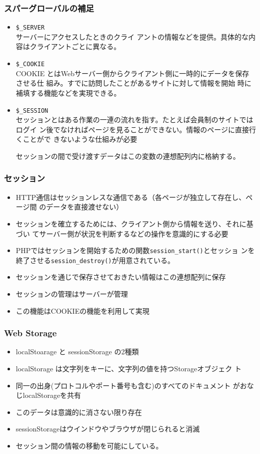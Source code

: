 \begin{frame}[containsverbatim]
\frametitle{スパーグローバルの補足}
\begin{itemize}
 \item {\texttt{\$\_SERVER}}\\
サーバーにアクセスしたときのクライ
アントの情報などを提供。具体的な内容はクライアントごとに異なる。
 \item \texttt{\$\_COOKIE}\\
COOKIE とはWebサーバー側からクライアント側に一時的にデータを保存させる仕
組み。すでに訪問したことがあるサイトに対して情報を開始
時に補填する機能などを実現できる。
 \item \texttt{\$\_SESSION}\\
セッションとはある作業の一連の流れを指す。たとえば会員制のサイトではログイ
ン後でなければページを見ることができない。情報のページに直接行くことがで
       きないような仕組みが必要

  セッションの間で受け渡すデータはこの変数の連想配列内に格納する。
\end{itemize}
\end{frame}
\begin{frame}[containsverbatim]
\frametitle{セッション}
\begin{itemize}
 \item HTTP通信はセッションレスな通信である（各ページが独立して存在し、ページ間
のデータを直接渡せない）
 \item セッションを確立するためには、クライアント側から情報を送り、それに基づい
てサーバー側が状況を判断するなどの操作を意識的にする必要
 \item PHPではセッションを開始するための関数\texttt{session\_start()}とセッショ
ンを終了させる\texttt{session\_destroy()}が用意されている。
 \item セッションを通じで保存させておきたい情報はこの連想配列に保存
 \item セッションの管理はサーバーが管理
 \item この機能はCOOKIEの機能を利用して実現
\end{itemize}
\end{frame}
 \iffalse\else
\begin{frame}[containsverbatim]
 \frametitle{Web Storage}
\begin{itemize}
 \item localStoarage と sessionStorage の2種類
 \item localStorage は文字列をキーに、文字列の値を持つStorageオブジェク
ト
 \item 同一の出身(プロトコルやポート番号も含む)のすべてのドキュメント
がおなじlocalStorageを共有
 \item このデータは意識的に消さない限り存在
 \item sessionStorageはウインドウやブラウザが閉じられると消滅
 \item セッション間の情報の移動を可能にしている。
\end{itemize}
\end{frame}

